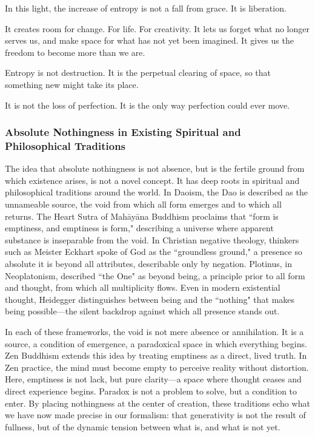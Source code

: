 \documentclass[12pt]{article}
\begin{document}
In this light, the increase of entropy is not a fall from grace.  
It is liberation.

It creates room for change. For life. For creativity.  
It lets us forget what no longer serves us, and make space for what has not yet been imagined.  
It gives us the freedom to become more than we are.

Entropy is not destruction.  
It is the perpetual clearing of space, so that something new might take its place.

It is not the loss of perfection. It is the only way perfection could ever move.

\subsubsection{Absolute Nothingness in Existing Spiritual and Philosophical Traditions}

The idea that absolute nothingness is not absence, but is the fertile ground from which existence arises, is not a novel concept. It has deep roots in spiritual and philosophical traditions around the world. In Daoism, the Dao is described as the unnameable source, the void from which all form emerges and to which all returns. The Heart Sutra of Mahāyāna Buddhism proclaims that ``form is emptiness, and emptiness is form," describing a universe where apparent substance is inseparable from the void. In Christian negative theology, thinkers such as Meister Eckhart spoke of God as the ``groundless ground," a presence so absolute it is beyond all attributes, describable only by negation. Plotinus, in Neoplatonism, described ``the One" as beyond being, a principle prior to all form and thought, from which all multiplicity flows. Even in modern existential thought, Heidegger distinguishes between being and the ``nothing" that makes being possible—the silent backdrop against which all presence stands out. 

In each of these frameworks, the void is not mere absence or annihilation. It is a source, a condition of emergence, a paradoxical space in which everything begins. Zen Buddhism extends this idea by treating emptiness as a direct, lived truth. In Zen practice, the mind must become empty to perceive reality without distortion. Here, emptiness is not lack, but pure clarity—a space where thought ceases and direct experience begins. Paradox is not a problem to solve, but a condition to enter. By placing nothingness at the center of creation, these traditions echo what we have now made precise in our formalism: that generativity is not the result of fullness, but of the dynamic tension between what is, and what is not yet.
\end{document}

